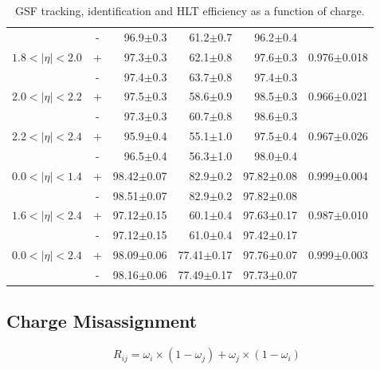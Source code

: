 \begin{table}[htbp]
\begin{center}
\begin{tabular}{lcrrrr}
                   &-& 96.9$\pm$0.3 &61.2$\pm$0.7 &96.2$\pm$0.4 & \\
$1.8<| \eta |<2.0$ &+& 97.3$\pm$0.3 &62.1$\pm$0.8 &97.6$\pm$0.3 & 0.976$\pm$0.018\\
                   &-& 97.4$\pm$0.3 &63.7$\pm$0.8 &97.4$\pm$0.3 & \\
$2.0<| \eta |<2.2$ &+& 97.5$\pm$0.3 &58.6$\pm$0.9 &98.5$\pm$0.3 & 0.966$\pm$0.021\\
                   &-& 97.3$\pm$0.3 &60.7$\pm$0.8 &98.6$\pm$0.3 & \\
$2.2<| \eta |<2.4$ &+& 95.9$\pm$0.4 &55.1$\pm$1.0 &97.5$\pm$0.4 & 0.967$\pm$0.026\\
                   &-& 96.5$\pm$0.4 &56.3$\pm$1.0 &98.0$\pm$0.4 & \\

\hline
$0.0<| \eta |<1.4$ &+& 98.42$\pm$0.07 &82.9$\pm$0.2 &97.82$\pm$0.08 & 0.999$\pm$0.004\\
                   &-& 98.51$\pm$0.07 &82.9$\pm$0.2 &97.82$\pm$0.08 & \\
$1.6<| \eta |<2.4$ &+& 97.12$\pm$0.15 &60.1$\pm$0.4 &97.63$\pm$0.17 & 0.987$\pm$0.010\\
                   &-& 97.12$\pm$0.15 &61.0$\pm$0.4 &97.42$\pm$0.17 & \\
\hline
$0.0<| \eta |<2.4$ &+& 98.09$\pm$0.06 &77.41$\pm$0.17 &97.76$\pm$0.07 & 0.999$\pm$0.003\\
                   &-& 98.16$\pm$0.06 &77.49$\pm$0.17 &97.73$\pm$0.07 & \\
\end{tabular}
\end{center}
\caption{\label{tab:efficiency} GSF tracking, identification and HLT efficiency as a function of charge.}
\end{table}

\subsection{Charge Misassignment}
\begin{equation}
R_{ij}=\omega_i \times(1-\omega_j) + \omega_j \times(1-\omega_i)
\end{equation}

